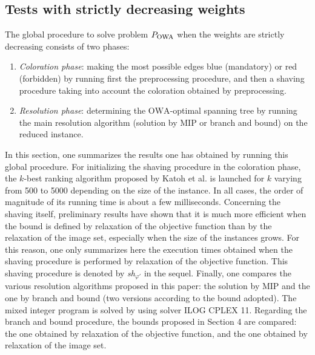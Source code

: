 \documentclass[final,3p,times]{elsarticle}
\newcommand{\owa}{\mbox{OWA}}
\begin{document}
\subsection{Tests with strictly decreasing weights}

The global procedure to solve problem $P_{\mbox{\sc owa}}$ when the
weights are strictly decreasing consists of two phases: 
\begin{enumerate}
\item \emph{Coloration phase}: making the most possible edges blue (mandatory) or
  red (forbidden) by running first the preprocessing procedure, and then a shaving procedure taking into account the coloration obtained by preprocessing. 
\item \emph{Resolution phase}: determining the $\owa$-optimal spanning
  tree by running the main resolution algorithm (solution by MIP or
  branch and bound) on the reduced instance.
\end{enumerate}

In this section, one summarizes the results one has obtained by
running this global procedure. For initializing the shaving procedure in the coloration phase, the $k$-best ranking algorithm proposed by Katoh et al. \cite{KatIM81} is launched for $k$ varying from 500 to 5000 depending on the size of the instance. In all cases, the order of magnitude of its running time is about a few milliseconds. Concerning the shaving itself, preliminary
results have shown that it is much more efficient
when the bound is defined by relaxation of the objective function than by the
relaxation of the image set, especially when the
size of the instances grows. For this reason, one only summarizes here
the execution times obtained when the shaving procedure is performed
by relaxation of the objective function. This shaving procedure is
denoted by \emph{sh$_{\varphi'}$} in the sequel. Finally, one compares the various
resolution algorithms proposed in this paper: the solution by MIP and the one by
branch and bound (two versions according to the bound adopted). The mixed integer program is solved by using solver ILOG CPLEX 11. Regarding the branch and bound procedure, the bounds proposed in Section 4 are compared: the one obtained by relaxation of the objective function, and the one obtained by relaxation of the image set. 
\end{document}
